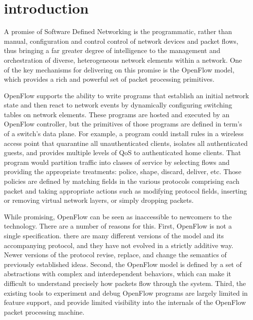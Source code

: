 
\section{introduction}
\label{sec:ref}

A promise of Software Defined Networking is the programmatic, rather
than manual, configuration and control control of network devices and packet 
flows, thus bringing a far greater degree of intelligence to the management and
orchestration of diverse, heterogeneous network elements within a
network. One of the key mechanisms for delivering on this promise is
the OpenFlow model, which provides a rich and powerful set of packet 
processing primitives.


OpenFlow supports the ability to write programs that establish an initial
network state and then react to network events by dynamically configuring 
switching tables on network elements. These programs are hosted and executed by 
an OpenFlow controller, but the primitives of those programs are
defined in term's of a switch's data plane. For example, a program could install
rules in a wireless access point that quarantine all unauthenticated clients, 
isolates all authenticated guests, and provides multiple levels of QoS to
authenticated home clients. That program would partition traffic into classes of
service by selecting flows and providing the appropriate treatments: police,
shape, discard, deliver, etc. 
Those policies are defined by matching fields in the various protocols 
comprising each packet and taking appropriate actions such as modifying 
protocol fields, inserting or removing virtual network layers, or simply
dropping packets.


While promising, OpenFlow can be seen as inaccessible to newcomers to the 
technology. There are a number of reasons for this. First, OpenFlow is not a 
single specification. there are many different versions of the model and its 
accompanying protocol, and they have not evolved in a strictly additive way. 
Newer versions of the protocol revise, replace, and change the semantics of 
previously established ideas. Second, the OpenFlow model is defined by a set of 
abstractions with complex and interdependent behaviors, which can make it 
difficult to understand precisely how packets flow through the system.
Third, the existing tools to experiment and debug OpenFlow programs are 
largely limited in feature support, and provide limited visibility into the 
internals of the OpenFlow packet processing machine.

